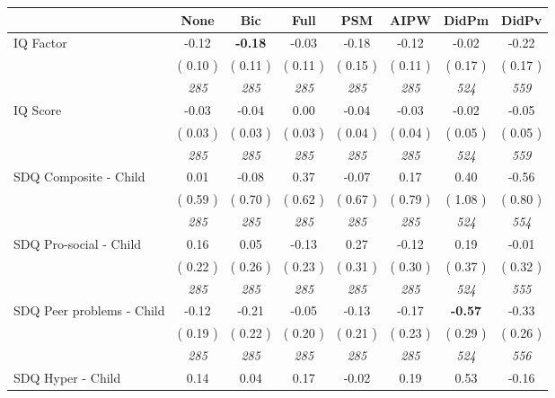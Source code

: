 \begin{tabular}{l c c c c c c c}
\toprule
 & None & Bic & Full & PSM & AIPW & DidPm & DidPv \\
\midrule
IQ Factor &     -0.12 & \textbf{     -0.18 } &     -0.03 &     -0.18 &     -0.12 &     -0.02 &     -0.22 \\
& (     0.10 ) & (     0.11 ) & (     0.11 ) & (     0.15 ) & (     0.11 ) & (     0.17 ) & (     0.17 ) \\
& \textit{ 285 } & \textit{ 285 } & \textit{ 285 } & \textit{ 285 } & \textit{ 285 } & \textit{ 524 } & \textit{ 559 } \\
IQ Score &     -0.03 &     -0.04 &      0.00 &     -0.04 &     -0.03 &     -0.02 &     -0.05 \\
& (     0.03 ) & (     0.03 ) & (     0.03 ) & (     0.04 ) & (     0.04 ) & (     0.05 ) & (     0.05 ) \\
& \textit{ 285 } & \textit{ 285 } & \textit{ 285 } & \textit{ 285 } & \textit{ 285 } & \textit{ 524 } & \textit{ 559 } \\
SDQ Composite - Child &      0.01 &     -0.08 &      0.37 &     -0.07 &      0.17 &      0.40 &     -0.56 \\
& (     0.59 ) & (     0.70 ) & (     0.62 ) & (     0.67 ) & (     0.79 ) & (     1.08 ) & (     0.80 ) \\
& \textit{ 285 } & \textit{ 285 } & \textit{ 285 } & \textit{ 285 } & \textit{ 285 } & \textit{ 524 } & \textit{ 554 } \\
SDQ Pro-social - Child &      0.16 &      0.05 &     -0.13 &      0.27 &     -0.12 &      0.19 &     -0.01 \\
& (     0.22 ) & (     0.26 ) & (     0.23 ) & (     0.31 ) & (     0.30 ) & (     0.37 ) & (     0.32 ) \\
& \textit{ 285 } & \textit{ 285 } & \textit{ 285 } & \textit{ 285 } & \textit{ 285 } & \textit{ 524 } & \textit{ 555 } \\
SDQ Peer problems - Child &     -0.12 &     -0.21 &     -0.05 &     -0.13 &     -0.17 & \textbf{     -0.57 } &     -0.33 \\
& (     0.19 ) & (     0.22 ) & (     0.20 ) & (     0.21 ) & (     0.23 ) & (     0.29 ) & (     0.26 ) \\
& \textit{ 285 } & \textit{ 285 } & \textit{ 285 } & \textit{ 285 } & \textit{ 285 } & \textit{ 524 } & \textit{ 556 } \\
SDQ Hyper - Child &      0.14 &      0.04 &      0.17 &     -0.02 &      0.19 &      0.53 &     -0.16 \\

\end{tabular}
